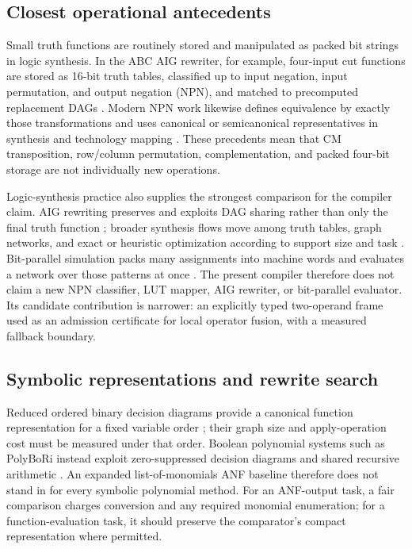 \documentclass[11pt]{article}
\begin{document}
{\subsection{Closest operational antecedents}

Small truth functions are routinely stored and manipulated as packed bit
strings in logic synthesis. In the ABC AIG rewriter, for example, four-input
cut functions are stored as 16-bit truth tables, classified up to input
negation, input permutation, and output negation (NPN), and matched to
precomputed replacement DAGs \citep{mishchenko2006}. Modern NPN work likewise
defines equivalence by exactly those transformations and uses canonical or
semicanonical representatives in synthesis and technology mapping
\citep{zhou2019}. These precedents mean that CM transposition, row/column
permutation, complementation, and packed four-bit storage are not individually
new operations.

Logic-synthesis practice also supplies the strongest comparison for the
compiler claim. AIG rewriting preserves and exploits DAG sharing rather than
only the final truth function \citep{mishchenko2006}; broader synthesis flows
move among truth tables, graph networks, and exact or heuristic optimization
according to support size and task \citep{testa2019}. Bit-parallel simulation
packs many assignments into machine words and evaluates a network over those
patterns at once \citep{lee2022}. The present compiler therefore does not
claim a new NPN classifier, LUT mapper, AIG rewriter, or bit-parallel evaluator.
Its candidate contribution is narrower: an explicitly typed two-operand frame
used as an admission certificate for local operator fusion, with a measured
fallback boundary.

\subsection{Symbolic representations and rewrite search}
Reduced ordered binary decision diagrams provide a canonical function
representation for a fixed variable order \citep{bryant1986}; their graph
size and apply-operation cost must be measured under that order. Boolean
polynomial systems such as PolyBoRi instead exploit zero-suppressed decision
diagrams and shared recursive arithmetic \citep{brickenstein2008}. An expanded
list-of-monomials ANF baseline therefore does not stand in for every symbolic
polynomial method. For an ANF-output task, a fair comparison charges conversion
and any required monomial enumeration; for a function-evaluation task, it
should preserve the comparator's compact representation where permitted.

}
\end{document}
